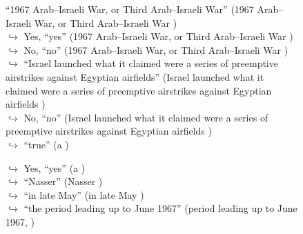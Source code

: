 \documentclass[11pt,a4paper, onecolumn]{article}
\begin{document}
\begin{figure}[t]
\begin{tcolorbox}[boxsep=0pt,left=5pt,right=0pt,top=2pt,colback = yellow!5]
\begin{dialogue}
{ ``1967 Arab–Israeli War, or Third Arab–Israeli War'' (1967 Arab–Israeli War, or Third Arab–Israeli War ) }
\\
\colorbox{pink!25}{$\hookrightarrow$}
\colorbox{red!25}{Yes,}
{ ``yes'' (1967 Arab–Israeli War, or Third Arab–Israeli War ) }
\\
\colorbox{pink!25}{$\hookrightarrow$}
\colorbox{red!25}{No,}
{ ``no'' (1967 Arab–Israeli War, or Third Arab–Israeli War ) }
\\
\colorbox{pink!25}{$\hookrightarrow$}
{ ``Israel launched what it claimed were a series of preemptive airstrikes against Egyptian airfields'' (Israel launched what it claimed were a series of preemptive airstrikes against Egyptian airfields ) }
\\
\colorbox{pink!25}{$\hookrightarrow$}
\colorbox{red!25}{No,}
{ ``no'' (Israel launched what it claimed were a series of preemptive airstrikes against Egyptian airfields ) }
\\
\colorbox{pink!25}{$\hookrightarrow$}
{ ``true'' (a ) }
 \end{dialogue}\end{tcolorbox}\end{figure}\begin{figure}[t] \small \begin{tcolorbox}[boxsep=0pt,left=5pt,right=0pt,top=2pt,colback = yellow!5] \begin{dialogue}
 \small 
\colorbox{pink!25}{$\hookrightarrow$}
\colorbox{red!25}{Yes,}
{ ``yes'' (a ) }
\\
\colorbox{pink!25}{$\hookrightarrow$}
{ ``Nasser'' (Nasser ) }
\\
\colorbox{pink!25}{$\hookrightarrow$}
{ ``in late May'' (in late May ) }
\\
\colorbox{pink!25}{$\hookrightarrow$}
{ ``the period leading up to June 1967'' (period leading up to June 1967, ) }
\\
 \end{dialogue}\end{tcolorbox}\end{figure}
\end{document}
